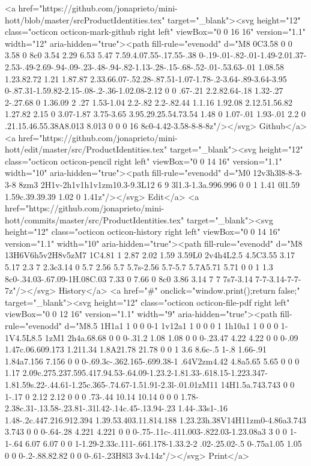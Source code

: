       <a href="https://github.com/jonaprieto/mini-hott/blob/master/srcProductIdentities.tex" target="_blank"><svg height="12" class="octicon octicon-mark-github right left" viewBox="0 0 16 16" version="1.1" width="12" aria-hidden="true"><path fill-rule="evenodd" d="M8 0C3.58 0 0 3.58 0 8c0 3.54 2.29 6.53 5.47 7.59.4.07.55-.17.55-.38 0-.19-.01-.82-.01-1.49-2.01.37-2.53-.49-2.69-.94-.09-.23-.48-.94-.82-1.13-.28-.15-.68-.52-.01-.53.63-.01 1.08.58 1.23.82.72 1.21 1.87.87 2.33.66.07-.52.28-.87.51-1.07-1.78-.2-3.64-.89-3.64-3.95 0-.87.31-1.59.82-2.15-.08-.2-.36-1.02.08-2.12 0 0 .67-.21 2.2.82.64-.18 1.32-.27 2-.27.68 0 1.36.09 2 .27 1.53-1.04 2.2-.82 2.2-.82.44 1.1.16 1.92.08 2.12.51.56.82 1.27.82 2.15 0 3.07-1.87 3.75-3.65 3.95.29.25.54.73.54 1.48 0 1.07-.01 1.93-.01 2.2 0 .21.15.46.55.38A8.013 8.013 0 0 0 16 8c0-4.42-3.58-8-8-8z"/></svg> Github</a>
      <a href="https://github.com/jonaprieto/mini-hott/edit/master/src/ProductIdentities.tex" target="_blank"><svg height="12" class="octicon octicon-pencil right left" viewBox="0 0 14 16" version="1.1" width="10" aria-hidden="true"><path fill-rule="evenodd" d="M0 12v3h3l8-8-3-3-8 8zm3 2H1v-2h1v1h1v1zm10.3-9.3L12 6 9 3l1.3-1.3a.996.996 0 0 1 1.41 0l1.59 1.59c.39.39.39 1.02 0 1.41z"/></svg> Edit</a>
      <a href="https://github.com/jonaprieto/mini-hott/commits/master/src/ProductIdentities.tex" target="_blank"><svg height="12" class="octicon octicon-history right left" viewBox="0 0 14 16" version="1.1" width="10" aria-hidden="true"><path fill-rule="evenodd" d="M8 13H6V6h5v2H8v5zM7 1C4.81 1 2.87 2.02 1.59 3.59L0 2v4h4L2.5 4.5C3.55 3.17 5.17 2.3 7 2.3c3.14 0 5.7 2.56 5.7 5.7s-2.56 5.7-5.7 5.7A5.71 5.71 0 0 1 1.3 8c0-.34.03-.67.09-1H.08C.03 7.33 0 7.66 0 8c0 3.86 3.14 7 7 7s7-3.14 7-7-3.14-7-7-7z"/></svg> History</a>
      <a  href="#" onclick="window.print();return false;" target="_blank"><svg height="12" class="octicon octicon-file-pdf right left" viewBox="0 0 12 16" version="1.1" width="9" aria-hidden="true"><path fill-rule="evenodd" d="M8.5 1H1a1 1 0 0 0-1 1v12a1 1 0 0 0 1 1h10a1 1 0 0 0 1-1V4.5L8.5 1zM1 2h4a.68.68 0 0 0-.31.2 1.08 1.08 0 0 0-.23.47 4.22 4.22 0 0 0-.09 1.47c.06.609.173 1.211.34 1.8A21.78 21.78 0 0 1 3.6 8.6c-.5 1-.8 1.66-.91 1.84a7.156 7.156 0 0 0-.69.3c-.362.165-.699.38-1 .64V2zm4.42 4.8a5.65 5.65 0 0 0 1.17 2.09c.275.237.595.417.94.53-.64.09-1.23.2-1.81.33-.618.15-1.223.347-1.81.59s.22-.44.61-1.25c.365-.74.67-1.51.91-2.3l-.01.01zM11 14H1.5a.743.743 0 0 1-.17 0 2.12 2.12 0 0 0 .73-.44 10.14 10.14 0 0 0 1.78-2.38c.31-.13.58-.23.81-.31l.42-.14c.45-.13.94-.23 1.44-.33s1-.16 1.48-.2c.447.216.912.394 1.39.53.403.11.814.188 1.23.23h.38V14H11zm0-4.86a3.743 3.743 0 0 0-.64-.28 4.221 4.221 0 0 0-.75-.11c-.411.003-.822.03-1.23.08a3 3 0 0 1-1-.64 6.07 6.07 0 0 1-1.29-2.33c.111-.661.178-1.33.2-2 .02-.25.02-.5 0-.75a1.05 1.05 0 0 0-.2-.88.82.82 0 0 0-.61-.23H8l3 3v4.14z"/></svg> Print</a>
